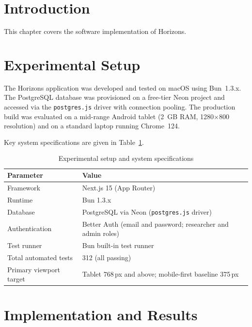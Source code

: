 \documentclass[12pt,a4paper,oneside]{report}
\begin{document}
\section{Introduction}

This chapter covers the software implementation of Horizons.

\section{Experimental Setup}

The Horizons application was developed and tested on macOS using Bun~1.3.x. The PostgreSQL database was provisioned on a free-tier Neon project and accessed via the \texttt{postgres.js} driver with connection pooling. The production build was evaluated on a mid-range Android tablet (2~GB RAM, 1280$\times$800 resolution) and on a standard laptop running Chrome~124.

Key system specifications are given in Table~\ref{tab:setup}.

\begin{table}[t]
  \caption{Experimental setup and system specifications}
  \label{tab:setup}
  \begin{tabularx}{\linewidth}{lX}
    \toprule
    \textbf{Parameter}            & \textbf{Value} \\
    \midrule
    Framework                     & Next.js 15 (App Router) \\
    Runtime                       & Bun 1.3.x \\
    Database                      & PostgreSQL via Neon (\texttt{postgres.js} driver) \\
    Authentication                & Better Auth (email and password; researcher and admin roles) \\
    Test runner                   & Bun built-in test runner \\
    Total automated tests         & 312 (all passing) \\
    Primary viewport target       & Tablet 768\,px and above; mobile-first baseline 375\,px \\
    \bottomrule
  \end{tabularx}
\end{table}

\section{Implementation and Results}
\end{document}
